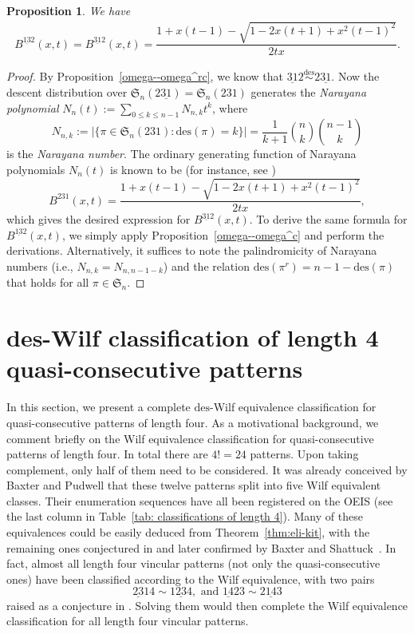 \documentclass[11pt,reqno]{amsart}
\numberwithin{equation}{section}
\theoremstyle{plain}
\newtheorem{proposition}[theorem]{Proposition}
\theoremstyle{definition}
\renewcommand{\S}{\mathfrak{S}}
\def\des{\mathrm{des}}
\begin{document}
\begin{proposition} \label{13-2}
    We have
    \begin{align*}
    B^{\underline{13}2}(x,t) = B^{\underline{31}2}(x,t)= \dfrac{1+x(t-1)-\sqrt{1-2x(t+1)+x^2(t-1)^2}}{2tx}.
    \end{align*}
\end{proposition}

\begin{proof}
By Proposition~\ref{omega--omega^rc}, we know that $\underline{31}2 \overset{\des}{\sim} 2\underline{31}$. Now the descent distribution over $\S_n(2\underline{31})=\S_n(231)$ generates the {\em Narayana polynomial} $N_n(t):=\sum_{0\le k\le n-1}N_{n,k}t^k$, where
$$N_{n,k}:=|\{\pi\in \S_n(231):\des(\pi)=k\}|=\frac{1}{k+1}\binom{n}{k}\binom{n-1}{k}$$
is the \textit{Narayana number}. The ordinary generating function of Narayana polynomials $N_n(t)$ is known to be (for instance, see \cite[Sect.~2.3]{pet15})
$$B^{231}(x,t)=\dfrac{1+x(t-1)-\sqrt{1-2x(t+1)+x^2(t-1)^2}}{2tx},$$
which gives the desired expression for $B^{\underline{31}2}(x,t)$. To derive the same formula for $B^{\underline{13}2}(x,t)$, we simply apply Proposition~\ref{omega--omega^c} and perform the derivations. Alternatively, it suffices to note the palindromicity of Narayana numbers (i.e., $N_{n,k}=N_{n,n-1-k}$) and the relation $\des(\pi^r)=n-1-\des(\pi)$ that holds for all $\pi\in\S_n$.
\end{proof}




    

\section{des-Wilf classification of length 4 quasi-consecutive patterns} \label{sec:classifications of 4}


In this section, we present a complete $\des$-Wilf equivalence classification for quasi-consecutive patterns of length four. As a motivational background, we comment briefly on the Wilf equivalence classification for quasi-consecutive patterns of length four. In total there are $4!=24$ patterns. Upon taking complement, only half of them need to be considered. It was already conceived by Baxter and Pudwell \cite[Table 6]{BP12} that these twelve patterns split into five Wilf equivalent classes. Their enumeration sequences have all been registered on the OEIS (see the last column in Table~\ref{tab: classifications of length 4}). Many of these equivalences could be easily deduced from Theorem~\ref{thm:eli-kit}, with the remaining ones conjectured in \cite[Conj.~17]{BP12} and later confirmed by Baxter and Shattuck~\cite{BS15}. In fact, almost all length four vincular patterns (not only the quasi-consecutive ones) have been classified according to the Wilf equivalence, with two pairs
$$\underline{23}14\sim 1\underline{23}4,\text{ and } \underline{14}23\sim 2\underline{14}3$$
raised as a conjecture in \cite{BS15}. Solving them would then complete the Wilf equivalence classification for all length four vincular patterns.
\end{document}
